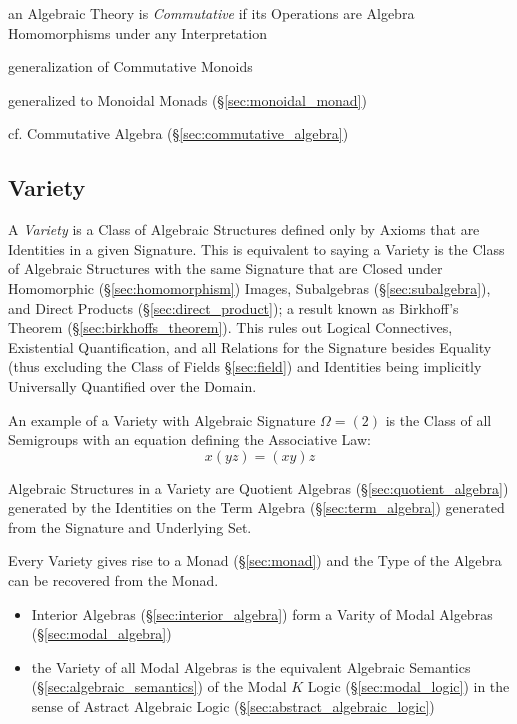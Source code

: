 an Algebraic Theory is \emph{Commutative} if its Operations are Algebra
Homomorphisms under any Interpretation

generalization of Commutative Monoids

generalized to Monoidal Monads (\S\ref{sec:monoidal_monad})

\fist cf. Commutative Algebra (\S\ref{sec:commutative_algebra})



\subsection{Variety}\label{sec:variety}

A \emph{Variety} is a Class of Algebraic Structures defined only by
Axioms that are Identities in a given Signature. This is equivalent to
saying a Variety is the Class of Algebraic Structures with the same
Signature that are Closed under Homomorphic (\S\ref{sec:homomorphism})
Images, Subalgebras (\S\ref{sec:subalgebra}), and Direct Products
(\S\ref{sec:direct_product}); a result known as Birkhoff's Theorem
(\S\ref{sec:birkhoffs_theorem}). This rules out Logical Connectives,
Existential Quantification, and all Relations for the Signature
besides Equality (thus excluding the Class of Fields
\S\ref{sec:field}) and Identities being implicitly Universally
Quantified over the Domain.

An example of a Variety with Algebraic Signature $\Omega = (2)$ is the
Class of all Semigroups with an equation defining the Associative Law:
\[
    x(yz) = (xy)z
\]

Algebraic Structures in a Variety are Quotient Algebras
(\S\ref{sec:quotient_algebra}) generated by the Identities on the Term
Algebra (\S\ref{sec:term_algebra}) generated from the Signature and
Underlying Set.

Every Variety gives rise to a Monad (\S\ref{sec:monad}) and the Type
of the Algebra can be recovered from the Monad.

\begin{itemize}
  \item Interior Algebras (\S\ref{sec:interior_algebra}) form a Varity of Modal
    Algebras (\S\ref{sec:modal_algebra})
  \item the Variety of all Modal Algebras is the equivalent Algebraic Semantics
    (\S\ref{sec:algebraic_semantics}) of the Modal $K$ Logic
    (\S\ref{sec:modal_logic}) in the sense of Astract Algebraic Logic
    (\S\ref{sec:abstract_algebraic_logic})
\end{itemize}



